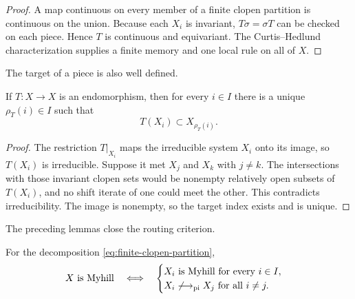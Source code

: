 \begin{proof}
A map continuous on every member of a finite clopen partition is continuous
on the union.  Because each $X_i$ is invariant, $T\sigma=\sigma T$ can be
checked on each piece.  Hence $T$ is continuous and equivariant.  The
Curtis--Hedlund characterization supplies a finite memory and one local rule
on all of $X$.
\end{proof}

The target of a piece is also well defined.

\begin{lemma}
\label{lem:unique-component-image}
If $T:X\to X$ is an endomorphism, then for every $i\in I$ there is a unique
$\rho_T(i)\in I$ such that
\begin{equation}
  T(X_i)\subset X_{\rho_T(i)}.
  \label{eq:component-route}
\end{equation}
\end{lemma}

\begin{proof}
The restriction $T|_{X_i}$ maps the irreducible system $X_i$ onto its image,
so $T(X_i)$ is irreducible.  Suppose it met $X_j$ and $X_k$ with $j\ne k$.
The intersections with those invariant clopen sets would be nonempty
relatively open subsets of $T(X_i)$, and no shift iterate of one could meet
the other.  This contradicts irreducibility.  The image is nonempty, so the
target index exists and is unique.
\end{proof}

The preceding lemmas close the routing criterion.

\begin{theorem}
\label{thm:routing}
For the decomposition \eqref{eq:finite-clopen-partition},
\begin{equation}
 X\text{ is Myhill}
 \quad\Longleftrightarrow\quad
 \begin{cases}
 X_i\text{ is Myhill for every }i\in I,\\
 X_i\not\mathrel{\longrightarrow_{\mathrm{pi}}} X_j\text{ for all }i\ne j.
 \end{cases}
 \label{eq:routing-theorem}
\end{equation}
\end{theorem}


